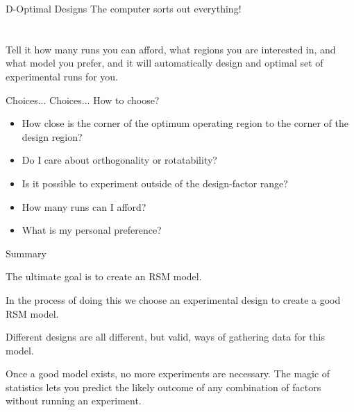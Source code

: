\documentclass[14pt]{beamer}
\begin{document}
\begin{frame}{D-Optimal Designs}
\pause
The computer sorts out everything!\\
\ \\
\ \\
\pause
Tell it how many runs you can afford, what regions you are interested in, and what model you prefer, and it will automatically design and optimal set of experimental runs for you. 
\end{frame}

\begin{frame}{Choices... Choices...}
\pause
How to choose?
\pause
\begin{itemize}
\item How close is the corner of the optimum operating region to the corner of the design region?
\pause
\item Do I care about orthogonality or rotatability?
\pause
\item Is it possible to experiment outside of the design-factor range?
\pause
\item How many runs can I afford?
\pause
\item What is my personal preference?
\end{itemize}
\end{frame}

\begin{frame}{Summary}
\pause

\begin{itemize}
{\normalsize
\item The ultimate goal is to create an RSM model.
\pause
\item  In the process of doing this we choose an experimental design to create a good RSM model.
\pause
\item Different designs are all different, but valid, ways of gathering data for this model.
\pause
\item Once a good model exists, no more experiments are necessary. The magic of statistics lets you predict the likely outcome of any combination of factors without running an experiment.

}
\end{itemize}

\end{frame}
\end{document}
